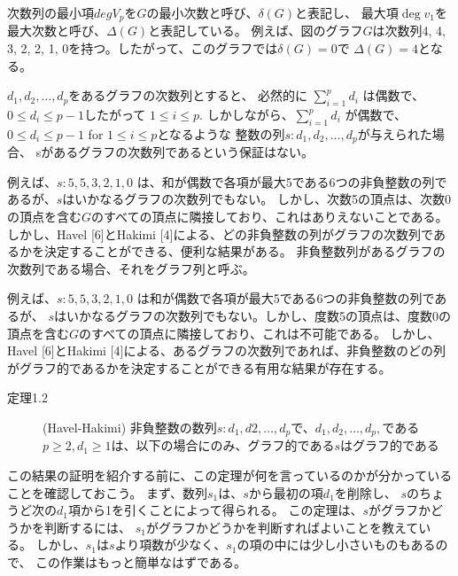 
次数列の最小項$deg V_p$を$G$の最小次数と呼び、$\delta(G)$と表記し、
最大項$\deg v_1$を最大次数と呼び、$\Delta(G)$と表記している。
例えば、図のグラフ$G$は次数列4, 4, 3, 2, 2, 1, 0を持つ。したがって、このグラフでは$\delta(G)=0$で $\Delta(G) = 4$となる。

$d_1, d_2, \ldots, d_p$をあるグラフの次数列とすると、
必然的に $\sum_{i=1}^{p} d_i$ は偶数で、$0 \leq  d_i \leq  p- 1$したがって $1 \leq i \leq p$.
しかしながら、$\sum_{i=1}^{p} d_i$ が偶数で、
$0 \leq d_i \leq p-1$ for $1 \leq i \leq p$となるような
整数の列$s: d_1, d_2,\ldots, d_p$が与えられた場合、
sがあるグラフの次数列であるという保証はない。

例えば、$s:5, 5, 3, 2, 1, 0$ は、和が偶数で各項が最大5である6つの非負整数の列であるが、$s$はいかなるグラフの次数列でもない。
しかし、次数5の頂点は、次数0の頂点を含む$G$のすべての頂点に隣接しており、これはありえないことである。
しかし、Havel [6]とHakimi [4]による、どの非負整数の列がグラフの次数列であるかを決定することができる、便利な結果がある。
非負整数列があるグラフの次数列である場合、それをグラフ列と呼ぶ。


例えば、$s: 5,5,3,2,1,0$ は和が偶数で各項が最大5である6つの非負整数の列であるが、
$s$はいかなるグラフの次数列でもない。しかし、度数5の頂点は、度数0の頂点を含む$G$のすべての頂点に隣接しており、これは不可能である。
しかし、Havel [6]とHakimi [4]による、あるグラフの次数列であれば、非負整数のどの列がグラフ的であるかを決定することができる有用な結果が存在する。

\begin{description}
  \item[定理1.2] (Havel-Hakimi)
  非負整数の数列$s:d_1, d2, \ldots ,d_p$で、$d_1, d_2, \ldots, d_p,$である $p \geq 2, d_1 \geq 1$は、以下の場合にのみ、グラフ的である$s$はグラフ的である
\end{description}

この結果の証明を紹介する前に、この定理が何を言っているのかが分かっていることを確認しておこう。
まず、数列$s_1$は、$s$から最初の項$d_1$を削除し、
$s$のちょうど次の$d_1$項から1を引くことによって得られる。
この定理は、$s$がグラフかどうかを判断するには、
$s_1$がグラフかどうかを判断すればよいことを教えている。
しかし、$s_1$は$s$より項数が少なく、$s_1$の項の中には少し小さいものもあるので、
この作業はもっと簡単なはずである。